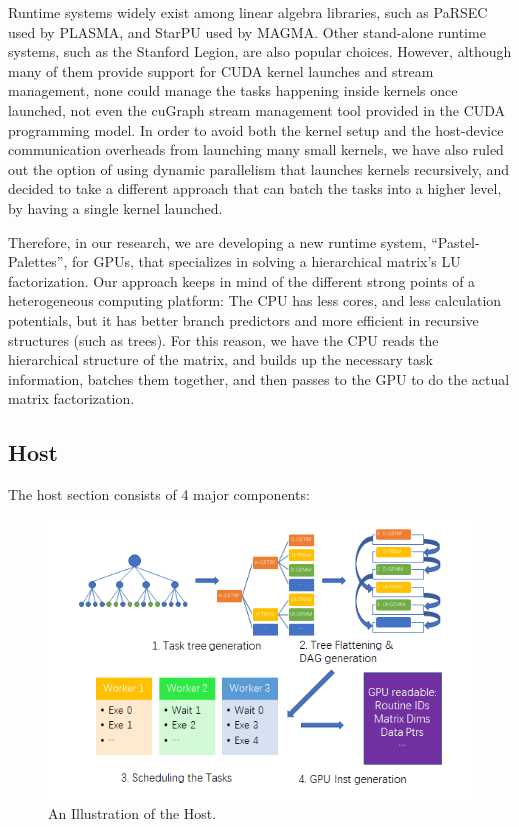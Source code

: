 \documentclass[sigconf]{acmart}
\begin{document}
Runtime systems widely exist among linear algebra libraries, such as PaRSEC used by PLASMA, and StarPU used by MAGMA.\cite{Hoque:2017:DTD:3148226.3148233, thibault:tel-01959127} Other stand-alone runtime systems, such as the Stanford Legion\cite{Bauer:2012:LEL:2388996.2389086}, are also popular choices. However, although many of them provide support for CUDA kernel launches and stream management, none could manage the tasks happening inside kernels once launched, not even the cuGraph stream management tool provided in the CUDA programming model. In order to avoid both the kernel setup and the host-device communication overheads from launching many small kernels, we have also ruled out the option of using dynamic parallelism that launches kernels recursively, and decided to take a different approach that can batch the tasks into a higher level, by having a single kernel launched.

Therefore, in our research, we are developing a new runtime system, ``Pastel-Palettes'', for GPUs, that specializes in solving a hierarchical matrix's LU factorization. Our approach keeps in mind of the different strong points of a heterogeneous computing platform: The CPU has less cores, and less calculation potentials, but it has better branch predictors and more efficient in recursive structures (such as trees). For this reason, we have the CPU reads the hierarchical structure of the matrix, and builds up the necessary task information, batches them together, and then passes to the GPU to do the actual matrix factorization.

\subsection{Host}

The host section consists of 4 major components:

\begin{figure}[ht]
  \centering
  \includegraphics[width=\linewidth]{host_illust}
  \caption{An Illustration of the Host.}
\end{figure}
\end{document}
